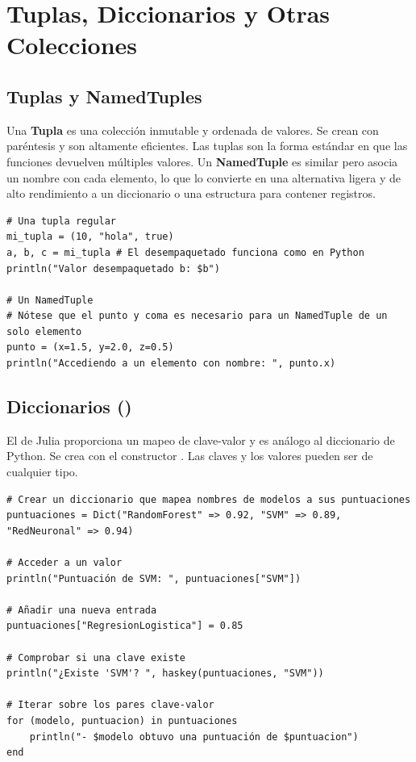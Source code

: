 \section{Tuplas, Diccionarios y Otras Colecciones}
\label{sec:julia_collections}

\subsection*{Tuplas y NamedTuples}
Una \textbf{Tupla} es una colección inmutable y ordenada de valores. Se crean con paréntesis y son altamente eficientes. Las tuplas son la forma estándar en que las funciones devuelven múltiples valores. Un \textbf{NamedTuple} es similar pero asocia un nombre con cada elemento, lo que lo convierte en una alternativa ligera y de alto rendimiento a un diccionario o una estructura para contener registros.

\text{ }\begin{verbatim}
# Una tupla regular
mi_tupla = (10, "hola", true)
a, b, c = mi_tupla # El desempaquetado funciona como en Python
println("Valor desempaquetado b: $b")

# Un NamedTuple
# Nótese que el punto y coma es necesario para un NamedTuple de un solo elemento
punto = (x=1.5, y=2.0, z=0.5)
println("Accediendo a un elemento con nombre: ", punto.x)
\end{verbatim}

\subsection*{Diccionarios ()}
El \textbf{} de Julia proporciona un mapeo de clave-valor y es análogo al diccionario de Python. Se crea con el constructor . Las claves y los valores pueden ser de cualquier tipo.

\text{ }\begin{verbatim}
# Crear un diccionario que mapea nombres de modelos a sus puntuaciones
puntuaciones = Dict("RandomForest" => 0.92, "SVM" => 0.89, "RedNeuronal" => 0.94)

# Acceder a un valor
println("Puntuación de SVM: ", puntuaciones["SVM"])

# Añadir una nueva entrada
puntuaciones["RegresionLogistica"] = 0.85

# Comprobar si una clave existe
println("¿Existe 'SVM'? ", haskey(puntuaciones, "SVM"))

# Iterar sobre los pares clave-valor
for (modelo, puntuacion) in puntuaciones
    println("- $modelo obtuvo una puntuación de $puntuacion")
end
\end{verbatim}

